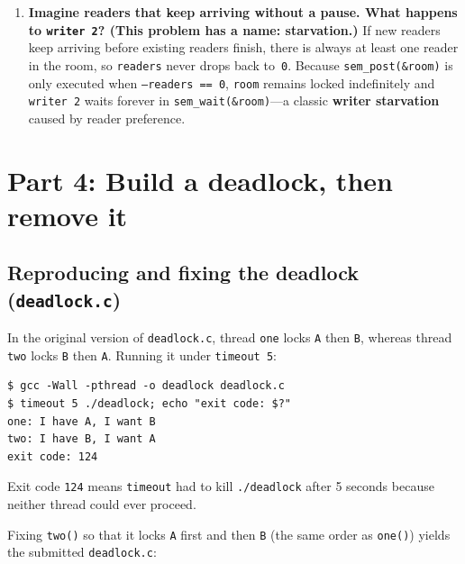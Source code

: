 \documentclass{../latex/utmreport}
\begin{document}
\begin{enumerate}
\item \textbf{Imagine readers that keep arriving without a pause. What happens to \texttt{writer 2}? (This problem has a name: starvation.)}
If new readers keep arriving before existing readers finish, there is always at least one reader in the room, so \texttt{readers} never drops back to~\texttt{0}. Because \texttt{sem\_post(\&room)} is only executed when \texttt{--readers == 0}, \texttt{room} remains locked indefinitely and \texttt{writer 2} waits forever in \texttt{sem\_wait(\&room)}—a classic \textbf{writer starvation} caused by reader preference.
\end{enumerate}

\chapter{Part 4: Build a deadlock, then remove it}

\section{Reproducing and fixing the deadlock (\texttt{deadlock.c})}

In the original version of \texttt{deadlock.c}, thread \texttt{one} locks \texttt{A} then \texttt{B}, whereas thread \texttt{two} locks \texttt{B} then \texttt{A}. Running it under \texttt{timeout 5}:

\begin{lstlisting}
$ gcc -Wall -pthread -o deadlock deadlock.c
$ timeout 5 ./deadlock; echo "exit code: $?"
one: I have A, I want B
two: I have B, I want A
exit code: 124
\end{lstlisting}

Exit code \texttt{124} means \texttt{timeout} had to kill \texttt{./deadlock} after 5 seconds because neither thread could ever proceed.

Fixing \texttt{two()} so that it locks \texttt{A} first and then \texttt{B} (the same order as \texttt{one()}) yields the submitted \texttt{deadlock.c}:
\end{document}
